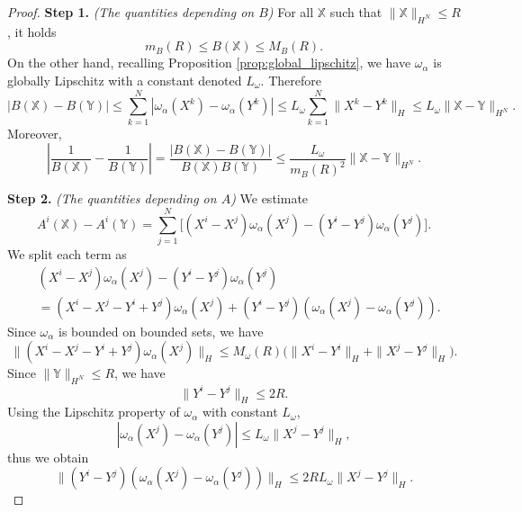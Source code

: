 \documentclass[12pt]{amsart}
\numberwithin{equation}{section}
\begin{document}
\begin{proof}
\textbf{Step 1.} \textit{(The quantities depending on $B$)}  
For all $\mathds{X}$ such that $\|\mathds{X}\|_{H^N} \le R$, it holds
\begin{equation}\label{eq: B bound}
m_B(R) \le B(\mathds{X}) \le M_B(R).
\end{equation}
On the other hand, recalling Proposition \ref{prop:global_lipschitz}, we have $\omega_\alpha$ is globally Lipschitz with a constant denoted $L_\omega$. Therefore
\begin{equation*}
    |B(\mathds{X}) - B(\mathds{Y})| \le \sum_{k=1}^N |\omega_\alpha(X^k) - \omega_\alpha(Y^k)| \le L_\omega \sum_{k=1}^N \|X^k - Y^k\|_H \le L_\omega \|\mathds{X} - \mathds{Y}\|_{H^N}.
\end{equation*}
Moreover, 
\begin{equation}\label{eq: B lip}
    \left|\frac{1}{B(\mathds{X})} - \frac{1}{B(\mathds{Y})}\right| = \frac{|B(\mathds{X}) - B(\mathds{Y})|}{B(\mathds{X}) B(\mathds{Y})} \le \frac{L_\omega}{m_B(R)^2} \|\mathds{X} - \mathds{Y}\|_{H^N}.
\end{equation}

\textbf{Step 2.} \textit{(The quantities depending on $A$)} 
We estimate 
\begin{equation*}
    A^i(\mathds{X}) - A^i(\mathds{Y}) = \sum_{j=1}^N \Big[(X^i - X^j)\omega_\alpha(X^j) - (Y^i - Y^j)\omega_\alpha(Y^j)\Big].
\end{equation*}
We split each term as
\begin{equation*}
\begin{aligned}
    &(X^i - X^j)\omega_\alpha(X^j) - (Y^i - Y^j)\omega_\alpha(Y^j) \\
    & = (X^i - X^j - Y^i + Y^j)\omega_\alpha(X^j) + (Y^i - Y^j)(\omega_\alpha(X^j) - \omega_\alpha(Y^j)).
\end{aligned}
\end{equation*}
\textbullet\; Since $\omega_\alpha$ is bounded on bounded sets, we have
\begin{equation*}
    \|(X^i - X^j - Y^i + Y^j)\omega_\alpha(X^j)\|_H \le M_\omega(R)\big(\|X^i - Y^i\|_H + \|X^j - Y^j\|_H\big).
\end{equation*}
\textbullet\; Since $\|\mathds{Y}\|_{H^N} \le R$, we have
\begin{equation*}
    \|Y^i - Y^j\|_H \le 2R.
\end{equation*}
\textbullet\; Using the Lipschitz property of $\omega_\alpha$ with constant $L_\omega$,
\begin{equation*}
    |\omega_\alpha(X^j) - \omega_\alpha(Y^j)| \le L_\omega \|X^j - Y^j\|_H,
\end{equation*}
thus we obtain
\begin{equation*} 
    \|(Y^i - Y^j)(\omega_\alpha(X^j) -    \omega_\alpha(Y^j))\|_H \le 2R L_\omega \|X^j - Y^j\|_H.
\end{equation*}


\end{proof}
\end{document}

